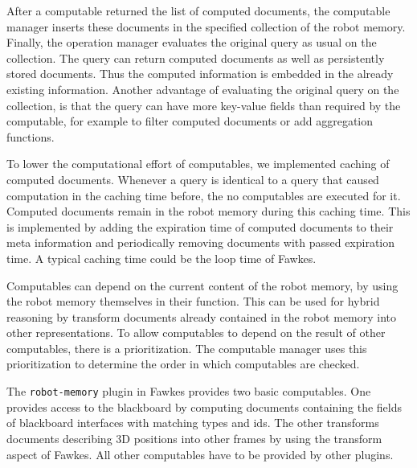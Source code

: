 After a computable returned the list of computed documents, the
computable manager inserts these documents in the specified collection
of the robot memory. Finally, the operation manager evaluates the
original query as usual on the collection. The query can return computed
documents as well as persistently stored documents. Thus the computed
information is embedded in the already existing information. Another
advantage of evaluating the original query on the collection, is that
the query can have more key-value fields than required by the
computable, for example to filter computed documents or add
aggregation functions.

To lower the computational effort of computables, we implemented
caching of computed documents. Whenever a query is identical to a
query that caused computation in the caching time before, the no
computables are executed for it. Computed documents remain in the
robot memory during this caching time. This is implemented by adding
the expiration time of computed documents to their meta information
and periodically removing documents with passed expiration time.
A typical caching time could be the loop time of Fawkes.

Computables can depend on the current content of the robot memory, by
using the robot memory themselves in their function. This can be used
for hybrid reasoning by transform documents already contained in the
robot memory into other representations. To allow computables to
depend on the result of other computables, there is a
prioritization. The computable manager uses this prioritization to
determine the order in which computables are checked.

The \texttt{robot-memory} plugin in Fawkes provides two basic
computables. One provides access to the blackboard by computing
documents containing the fields of blackboard interfaces with matching
types and ids. The other transforms documents describing 3D positions
into other frames by using the transform aspect of Fawkes. All other
computables have to be provided by other plugins.

